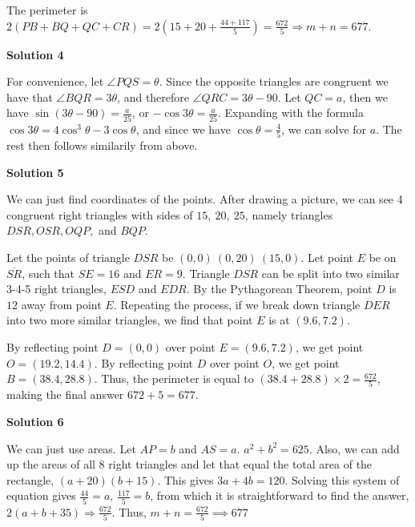 \begin{enumerate}
 The perimeter is $2(PB + BQ + QC + CR) = 2\left(15 + 20 + \frac {44 + 117}{5}\right) = \frac {672}{5}\Rightarrow m+n=677$.

 



\textbf{Solution 4}

For convenience, let $\angle PQS = \theta$. Since the opposite triangles are congruent we have that $\angle BQR = 3\theta$, and therefore $\angle QRC = 3\theta - 90$. Let $QC = a$, then we have $\sin{(3\theta - 90)} = \frac {a}{25}$, or $- \cos{3\theta} = \frac {a}{25}$. Expanding with the formula $\cos{3\theta} = 4\cos^3{\theta} - 3\cos{\theta}$, and since we have $\cos{\theta} = \frac {4}{5}$, we can solve for $a$. The rest then follows similarily from above.

 



\textbf{Solution 5}

We can just find coordinates of the points.  After drawing a picture, we can see 4 congruent right triangles with sides of $15,\ 20,\ 25$, namely triangles $DSR, OSR, OQP,$ and $BQP$.

 Let the points of triangle $DSR$ be $(0,0)\ (0,20)\ (15,0)$. Let point $E$ be on $\overline{SR}$, such that $SE = 16$ and $ER = 9$. Triangle $DSR$ can be split into two similar 3-4-5 right triangles, $ESD$ and $EDR$. By the Pythagorean Theorem, point $D$ is $12$ away from point $E$. Repeating the process, if we break down triangle $DER$ into two more similar triangles, we find that point $E$ is at $(9.6, 7.2)$.

 By reflecting point $D = (0,0)$ over point $E = (9.6, 7.2)$, we get point $O = (19.2, 14.4)$. By reflecting point $D$ over point $O$, we get point $B = (38.4, 28.8)$. Thus, the perimeter is equal to $(38.4 + 28.8)\times 2 = \frac {672}{5}$, making the final answer $672+5 = 677$.

 



\textbf{Solution 6}

We can just use areas. Let $AP = b$ and $AS = a$. $a^2 + b^2 = 625$. Also, we can add up the areas of all 8 right triangles and let that equal the total area of the rectangle, $(a+20)(b+15)$. This gives $3a + 4b = 120$. Solving this system of equation gives $\frac{44}{5} = a$, $\frac{117}{5} = b$, from which it is straightforward to find the answer, $2(a+b+35) \Rightarrow \frac{672}{5}$. Thus, $m+n = \frac{672}{5}\implies\boxed{677}$





\end{enumerate}

